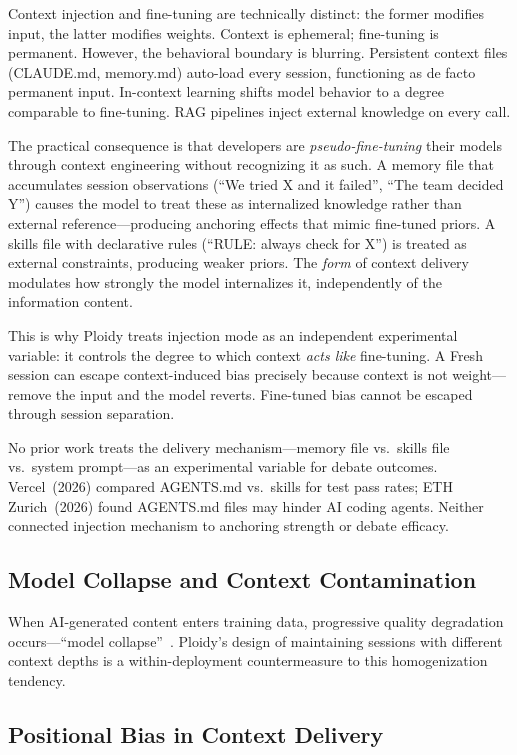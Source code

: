 \documentclass[11pt]{article}
\begin{document}
Context injection and fine-tuning are technically distinct: the former modifies input, the latter modifies weights. Context is ephemeral; fine-tuning is permanent. However, the behavioral boundary is blurring. Persistent context files (CLAUDE.md, memory.md) auto-load every session, functioning as de facto permanent input. In-context learning shifts model behavior to a degree comparable to fine-tuning. RAG pipelines inject external knowledge on every call.

The practical consequence is that developers are \emph{pseudo-fine-tuning} their models through context engineering without recognizing it as such. A memory file that accumulates session observations (``We tried X and it failed'', ``The team decided Y'') causes the model to treat these as internalized knowledge rather than external reference---producing anchoring effects that mimic fine-tuned priors. A skills file with declarative rules (``RULE: always check for X'') is treated as external constraints, producing weaker priors. The \emph{form} of context delivery modulates how strongly the model internalizes it, independently of the information content.

This is why Ploidy treats injection mode as an independent experimental variable: it controls the degree to which context \emph{acts like} fine-tuning. A Fresh session can escape context-induced bias precisely because context is not weight---remove the input and the model reverts. Fine-tuned bias cannot be escaped through session separation.

No prior work treats the delivery mechanism---memory file vs.\ skills file vs.\ system prompt---as an experimental variable for debate outcomes. Vercel~(2026) compared AGENTS.md vs.\ skills for test pass rates; ETH Zurich~(2026) found AGENTS.md files may hinder AI coding agents. Neither connected injection mechanism to anchoring strength or debate efficacy.

\subsection{Model Collapse and Context Contamination}
\label{sec:collapse}

When AI-generated content enters training data, progressive quality degradation occurs---``model collapse''~\citep{shumailov2024collapse}. Ploidy's design of maintaining sessions with different context depths is a within-deployment countermeasure to this homogenization tendency.

\subsection{Positional Bias in Context Delivery}
\label{sec:positional-bias}
\end{document}
